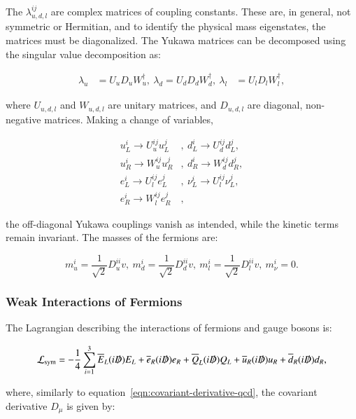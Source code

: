  The $\lambda_{u,d,l}^{ij}$ are complex matrices of coupling constants. These are, in general, not symmetric or Hermitian, and to identify the physical mass eigenstates, the matrices must be diagonalized. The Yukawa matrices can be decomposed using the singular value decomposition as:

\begin{align}
	\lambda_u &= U_u D_u W_u^{\dagger},\ \lambda_d = U_d D_d W_d^{\dagger},\ \lambda_l &= U_l D_l W_l^{\dagger},
\end{align}
 
where $U_{u,d,l}$ and $W_{u,d,l}$ are unitary matrices, and $D_{u,d,l}$ are diagonal, non-negative matrices. Making a change of variables,

\begin{align}\label{eqn:yukawa-diagonalization}
	u_L^i\rightarrow U_{u}^{ij}u_L^j&,\ d_L^i\rightarrow U_d^{ij}d_L^j, \\
	u_R^i\rightarrow W_{u}^{ij}u_R^j&,\ d_R^i\rightarrow W_d^{ij}d_R^j, \\
	e_L^i\rightarrow U_l^{ij}e_L^j&,\ \nu_L^i\rightarrow U_l^{ij}\nu_L^j, \\
	e_R^i\rightarrow W_l^{ij}e_R^j&,
\end{align}

the off-diagonal Yukawa couplings vanish as intended, while the kinetic terms remain invariant. The masses of the fermions are:

\begin{equation}
	m_u^i = \frac{1}{\sqrt{2}} D_u^{ii}v,\ m_d^i = \frac{1}{\sqrt{2}} D_d^{ii}v,\ m_l^i = \frac{1}{\sqrt{2}} D_l^{ii}v,\ m_{\nu}^i = 0.
\end{equation}


\subsubsection{Weak Interactions of Fermions}
The Lagrangian describing the interactions of fermions and gauge bosons is:

\begin{equation}\label{eqn:electroweak-lagrangian}
	\mathcal{L}_{\mathrm{sym}} =  -\frac{1}{4} \sum_{i=1}^3  \overline{E}_L (i\slashed{D}) E_L + \overline{e}_R(i\slashed{D})e_R + \overline{Q}_L(i\slashed{D})Q_L + \overline{u}_R(i\slashed{D})u_R+\overline{d}_R(i\slashed{D})d_R,
\end{equation}

where, similarly to equation~\ref{eqn:covariant-derivative-qcd}, the covariant derivative $D_{\mu}$ is given by:


